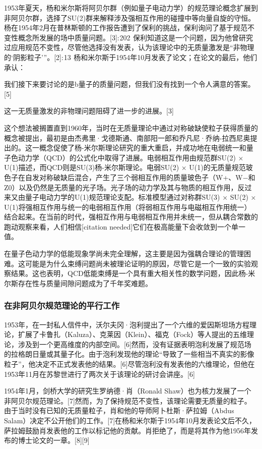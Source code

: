 1953年夏天，杨和米尔斯将阿贝尔群（例如量子电动力学）的规范理论概念扩展到非阿贝尔群，选择了SU(2)群来解释涉及强相互作用的碰撞中等向量自旋的守恒。杨在1954年2月在普林斯顿的工作报告遭到了保利的挑战，保利询问了基于规范不变性概念所发展的场中质量问题。[3]: 202  保利知道这是一个问题，因为他曾研究过应用规范不变性，尽管他选择没有发表，认为该理论中的无质量激发是“非物理的‘阴影粒子’”。[2]: 13  杨和米尔斯于1954年10月发表了论文；在论文的最后，他们承认：

我们接下来要讨论的是b量子的质量问题，但我们没有找到一个令人满意的答案。[5]

这一无质量激发的非物理问题阻碍了进一步的进展。[3]

这个想法被搁置直到1960年，当时在无质量理论中通过对称破缺使粒子获得质量的概念被提出，最初是由杰弗里·戈德斯通、南部阳一郎和乔凡尼·乔纳-拉西尼奥提出的。这一概念促使了杨-米尔斯理论研究的重大重启，并成功地在电弱统一和量子色动力学（QCD）的公式化中取得了进展。电弱相互作用由规范群SU(2) × U(1)描述，而QCD则是SU(3)杨-米尔斯理论。电弱SU(2) × U(1)的无质量规范玻色子在自发对称破缺后混合，产生了三个弱相互作用的质量玻色子（W+、W−和Z0）以及仍然是无质量的光子场。光子场的动力学及其与物质的相互作用，反过来又由量子电动力学的U(1)规范理论支配。标准模型通过对称群SU(3) × SU(2) × U(1)将强相互作用与统一的电弱相互作用（将弱相互作用与电磁相互作用统一）结合起来。在当前的时代，强相互作用与电弱相互作用并未统一，但从耦合常数的跑动观察来看，人们相信[citation needed]它们在极高能量下会收敛到一个单一值。

在量子色动力学的低能现象学尚未完全理解，这主要是因为强耦合理论的管理困难。这可能是为什么束缚问题尚未被理论证明的原因，尽管它是一个一致的实验观察结果。这也表明，QCD低能束缚是一个具有重大相关性的数学问题，因此杨-米尔斯存在性与质量间隙问题成为了千年奖难题。
\subsubsection{在非阿贝尔规范理论的平行工作}
1953年，在一封私人信件中，沃尔夫冈·泡利提出了一个六维的爱因斯坦场方程理论，扩展了卡鲁扎（Kaluza）、克莱因（Klein）、福克（Fock）等人提出的五维理论，涉及到一个更高维度的内部空间。[6]然而，没有证据表明泡利发展了规范场的拉格朗日量或其量子化。由于泡利发现他的理论“导致了一些相当不真实的影像粒子”，他决定不正式发表他的结果。[6]尽管泡利没有发表他的六维理论，但他在1953年11月在苏黎世进行了两次关于该理论的研讨会讲座。[6]

1954年1月，剑桥大学的研究生罗纳德·肖（Ronald Shaw）也为核力发展了一个非阿贝尔规范理论。[7]然而，为了保持规范不变性，该理论需要无质量的粒子。由于当时没有已知的无质量粒子，肖和他的导师阿卜杜斯·萨拉姆（Abdus Salam）决定不公开他们的工作。[7]在杨和米尔斯于1954年10月发表论文后不久，萨拉姆鼓励肖发表他的工作以标记他的贡献。肖拒绝了，而是将其作为他1956年发布的博士论文的一章。[8][9]


